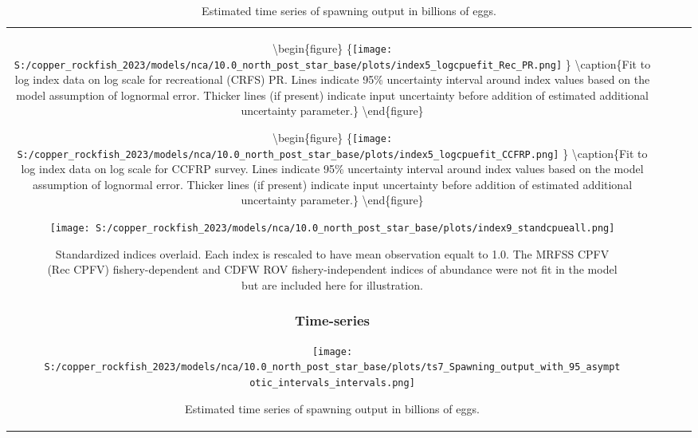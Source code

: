 \documentclass[11pt,
  letterpaper,
]{article}
\begin{document}
\begin{longtable}[t]{c>{\centering\arraybackslash}p{2cm}>{\centering\arraybackslash}p{2cm}>{\centering\arraybackslash}p{2cm}}
\pagebreak

\textbackslash begin\{figure\} \{\centering \texttt{[image: S:/copper\_rockfish\_2023/models/nca/10.0\_north\_post\_star\_base/plots/index5\_logcpuefit\_Rec\_PR.png]} \} \textbackslash caption\{Fit to log index data on log scale for recreational (CRFS) PR. Lines indicate 95\% uncertainty interval around index values based on the model assumption of lognormal error. Thicker lines (if present) indicate input uncertainty before addition of estimated additional uncertainty parameter.\label{fig:crfs-pr-index-fit}\} \textbackslash end\{figure\}

\pagebreak

\textbackslash begin\{figure\} \{\centering \texttt{[image: S:/copper\_rockfish\_2023/models/nca/10.0\_north\_post\_star\_base/plots/index5\_logcpuefit\_CCFRP.png]} \} \textbackslash caption\{Fit to log index data on log scale for CCFRP survey. Lines indicate 95\% uncertainty interval around index values based on the model assumption of lognormal error. Thicker lines (if present) indicate input uncertainty before addition of estimated additional uncertainty parameter.\label{fig:ccfrp-index-fit}\} \textbackslash end\{figure\}

\begin{figure}
{\centering
\texttt{[image: S:/copper\_rockfish\_2023/models/nca/10.0\_north\_post\_star\_base/plots/index9\_standcpueall.png]}
}
\caption{Standardized indices overlaid. Each index is rescaled to have mean observation equalt to 1.0. The  MRFSS CPFV (Rec CPFV) fishery-dependent and CDFW ROV fishery-independent indices of abundance were not fit in the model but are included here for illustration.\label{fig:standardized-indices}}
\end{figure}

\subsubsection{Time-series}\label{time-series}

\begin{figure}
{\centering
\texttt{[image: S:/copper\_rockfish\_2023/models/nca/10.0\_north\_post\_star\_base/plots/ts7\_Spawning\_output\_with\_95\_asymptotic\_intervals\_intervals.png]}
}
\caption{Estimated time series of spawning output in billions of eggs.\label{fig:ssb}}
\end{figure}


\end{longtable}
\end{document}
